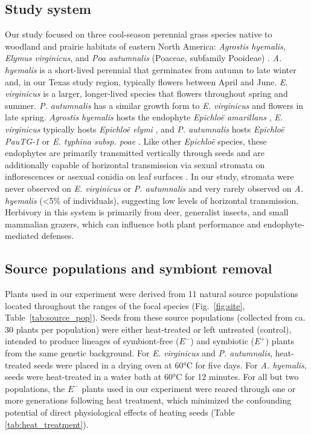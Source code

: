 \documentclass[12pt]{article}\usepackage[]{graphicx}\usepackage[dvipsnames]{xcolor}
\begin{document}
\subsection*{Study system}
Our study focused on three cool-season perennial grass species native to woodland and prairie habitats of eastern North America: \emph{Agrostis hyemalis}, \emph{Elymus virginicus}, and \emph{Poa autumnalis} (Poaceae, subfamily Pooideae) \citep{shaw2011guide}.
\emph{A. hyemalis} is a short-lived perennial that germinates from autumn to late winter and, in our Texas study region, typically flowers between April and June. 
\emph{E. virginicus} is a larger, longer-lived species that flowers throughout spring and summer. 
\emph{P. autumnalis} has a similar growth form to \emph{E. virginicus} and flowers in late spring. 
\emph{Agrostis hyemalis} hosts the endophyte \emph{Epichloë amarillans} \citep{white1994endophyte}, \emph{E. virginicus} typically hosts \emph{Epichloë elymi} \citep{liu2023fungi}, and \emph{P. autumnalis} hosts \emph{Epichloë PauTG-1} or \emph{E. typhina subsp. poae} \citep{gundel2020simulated}.
Like other \emph{Epichloë} species, these endophytes are primarily transmitted vertically through seeds and are additionally capable of horizontal transmission via sexual stromata on inflorescences or asexual conidia on leaf surfaces \citep{clay2002evolutionary, gundel2020simulated,leuchtmann2014nomenclatural}. 
In our study, stromata were never observed on \emph{E. virginicus} or \emph{P. autumnalis} and very rarely observed on \emph{A. hyemalis} (<5\% of individuals), suggesting low levels of horizontal transmission.
Herbivory in this system is primarily from deer, generalist insects, and small mammalian grazers, which can influence both plant performance and endophyte-mediated defenses. 

\subsection*{Source populations and symbiont removal}
Plants used in our experiment were derived from 11 natural source populations located throughout the ranges of the focal species (Fig.~\ref{fig:site}, Table~\ref{tab:source_pop}). 
Seeds from these source populations (collected from ca. 30 plants per population) were either heat-treated or left untreated (control), intended to produce lineages of symbiont-free ($E^-$) and symbiotic ($E^+$) plants from the same genetic background. 
For \emph{E. virginicus} and \emph{P. autumnalis}, heat-treated seeds were placed in a drying oven at 60°C for five days. 
For \emph{A. hyemalis}, seeds were heat-treated in a water bath at 60°C for 12 minutes.
For all but two populations, the $E^-$ plants used in our experiment were reared through one or more generations following heat treatment, which minimized the confounding potential of direct physiological effects of heating seeds (Table \ref{tab:heat_treatment}). 
\end{document}
